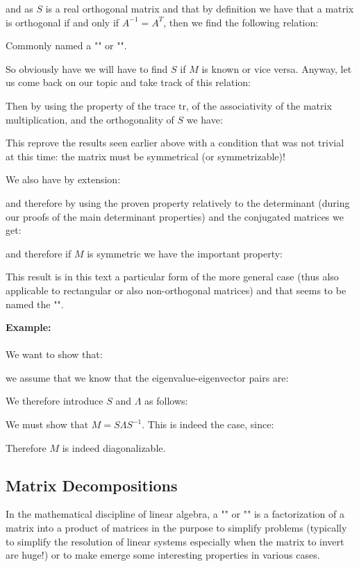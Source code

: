 	and as $S$ is a real orthogonal matrix and that by definition we have that a matrix is orthogonal if and only if $A^{-1}=A^T$, then we find the following relation:
	
	Commonly named a "" or "".
	
	So obviously have we will have to find $S$ if $M$ is known or vice versa. Anyway, let us come back on our topic and take track of this relation:
	
	Then by using the property of the trace $\text{tr}$, of the associativity of the matrix multiplication, and the orthogonality of $S$ we have:
	
	This reprove the results seen earlier above with a condition that was not trivial at this time: the matrix must be symmetrical (or symmetrizable)!
	
	We also have by extension:
	
	and therefore by using the proven property relatively to the determinant (during our proofs of the main determinant properties) and  the conjugated matrices we get:
	
	and therefore if $M$ is symmetric we have the important property:
	
	
	\begin{tcolorbox}[title=Remark,colframe=black,arc=10pt]
	 This result is in this text a particular form of the more general case (thus also applicable to rectangular or also non-orthogonal matrices) and that seems to be named the "".
	\end{tcolorbox}
	
	\begin{tcolorbox}[colframe=black,colback=white,sharp corners]
	\textbf{{\Large {}}Example:}\\\\
	We want to show that:
	
	we assume that we know that the eigenvalue-eigenvector pairs are:
	
	We therefore introduce $S$ and $\Lambda$ as follows:
	
	We must show that $M=S\Lambda S^{-1}$. This is indeed the case, since:
	
	Therefore $M$ is indeed diagonalizable.
	\end{tcolorbox}
	
	\pagebreak
	\subsection{Matrix Decompositions}
	In the mathematical discipline of linear algebra, a "" or "" is a factorization of a matrix into a product of matrices in the purpose to simplify problems (typically to simplify the resolution of linear systems especially when the matrix to invert are huge!) or to make emerge some interesting properties in various cases.
	

